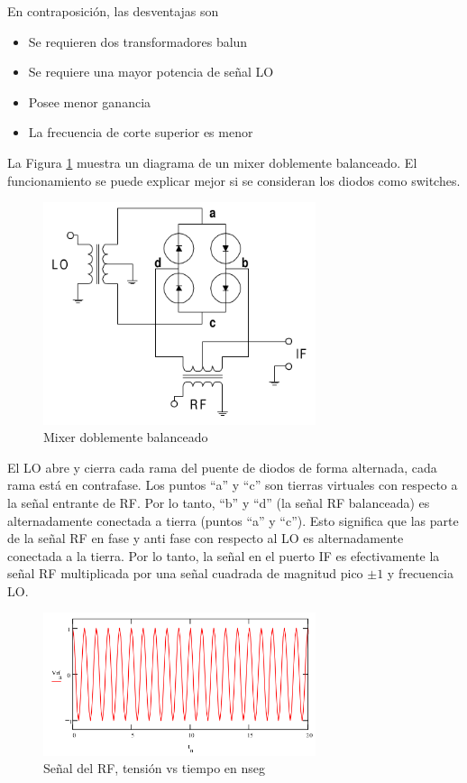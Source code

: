 \documentclass[a4paper,10pt]{article}
\begin{document}
	\indent En contraposición, las desventajas son

	\begin{itemize}
		\item Se requieren dos transformadores balun
		\item Se requiere una mayor potencia de señal LO
		\item Posee menor ganancia
		\item La frecuencia de corte superior es menor
	\end{itemize}

	\indent La Figura \ref{img:004} muestra un diagrama de un mixer doblemente 
	balanceado. El funcionamiento se puede explicar mejor si se consideran los 
	diodos como switches. \\
	
	\begin{figure}[!htb]
		\centering
		\includegraphics[width=8cm]{Images/DoubleBalancedMixer.png}
		\caption{Mixer doblemente balanceado}
		\label{img:004}
	\end{figure}

	
	\indent El LO abre y cierra cada rama del puente de diodos de
	forma alternada, cada rama está en contrafase. Los puntos ``a'' y ``c'' son 
	tierras virtuales con respecto a la señal entrante de RF. Por lo tanto, ``b'' 
	y ``d'' (la señal RF balanceada) es alternadamente conectada a tierra (puntos 
	``a'' y ``c''). Esto significa que las parte de la señal RF en fase y anti fase 
	con respecto al LO es alternadamente conectada a la tierra. Por lo tanto, la
	señal en el puerto IF es efectivamente la señal RF multiplicada por una 
	señal cuadrada de magnitud pico $\pm 1$ y frecuencia LO. \\
	
	\begin{figure}[!htb]
		\centering
		\includegraphics[width=8cm]{Images/VRF.png}
		\caption{Señal del RF, tensión vs tiempo en nseg}
		\label{img:005}
	\end{figure}
\end{document}
